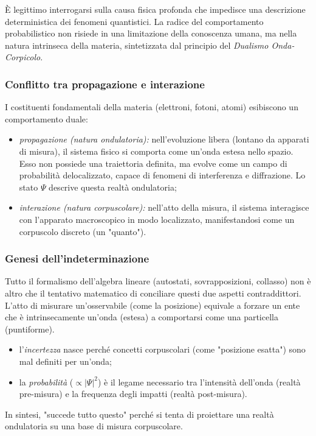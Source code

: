 \documentclass[a4paper,11pt]{report}
\begin{document}
\begin{approfondimento}[colback= white, colframe=green!35!black, no shadow, title={Origine fisica: Il Dualismo Onda-Corpicolo}]
È legittimo interrogarsi sulla causa fisica profonda che impedisce una descrizione deterministica dei fenomeni quantistici.
La radice del comportamento probabilistico non risiede in una limitazione della conoscenza umana, ma nella natura intrinseca della materia, sintetizzata dal principio del \textit{Dualismo Onda-Corpicolo}.

\subsubsection{Conflitto tra propagazione e interazione}
I costituenti fondamentali della materia (elettroni, fotoni, atomi) esibiscono un comportamento duale:
\begin{itemize}
    \item \textit{propagazione (natura ondulatoria):}
    nell'evoluzione libera (lontano da apparati di misura), il sistema fisico si comporta come un'onda estesa nello spazio. Esso non possiede una traiettoria definita, ma evolve come un campo di probabilità delocalizzato, capace di fenomeni di interferenza e diffrazione. Lo stato $\Psi$ descrive questa realtà ondulatoria;

    \item \textit{interazione (natura corpuscolare):}
    nell'atto della misura, il sistema interagisce con l'apparato macroscopico in modo localizzato, manifestandosi come un corpuscolo discreto (un "quanto").
\end{itemize}

\subsubsection{Genesi dell'indeterminazione}
Tutto il formalismo dell'algebra lineare (autostati, sovrapposizioni, collasso) non è altro che il tentativo matematico di conciliare questi due aspetti contraddittori.
L'atto di misurare un'osservabile (come la posizione) equivale a forzare un ente che è intrinsecamente un'onda (estesa) a comportarsi come una particella (puntiforme).
\begin{itemize}
    \item l'\textit{incertezza} nasce perché concetti corpuscolari (come "posizione esatta") sono mal definiti per un'onda;
    \item la \textit{probabilità} ($\propto |\Psi|^2$) è il legame necessario tra l'intensità dell'onda (realtà pre-misura) e la frequenza degli impatti (realtà post-misura).
\end{itemize}
In sintesi, "succede tutto questo" perché si tenta di proiettare una realtà ondulatoria su una base di misura corpuscolare.

\end{approfondimento}
\end{document}
